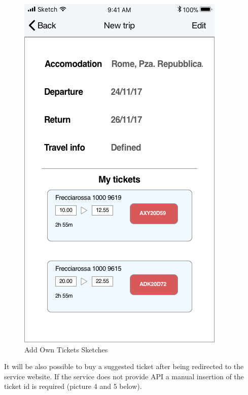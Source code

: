 \begin{figure}[H]
	\hspace{0.5cm}
	\includegraphics[scale=0.23]{Images/Interface/Trips/10_trip_review}
	\caption{Add Own Tickets Sketches}
\end{figure}
It will be also possible to buy a suggested ticket after being redirected to the service website. If the service does not provide API a manual insertion of the ticket id is required (picture 4 and 5 below).
